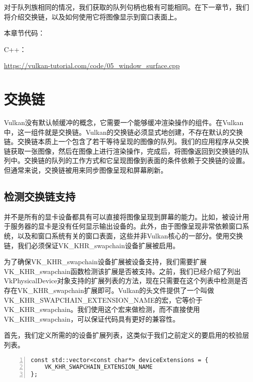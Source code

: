 \documentclass{ctexart}
\begin{document}
对于队列族相同的情况，我们获取的队列句柄也极有可能相同。在下一章节，我们将介绍交换链，以及如何使用它将图像显示到窗口表面上。

本章节代码：

C++：

\url{https://vulkan-tutorial.com/code/05_window_surface.cpp}

\newpage
\section{交换链}

Vulkan没有默认帧缓冲的概念，它需要一个能够缓冲渲染操作的组件。在Vulkan中，这一组件就是交换链。Vulkan的交换链必须显式地创建，不存在默认的交换链。交换链本质上一个包含了若干等待呈现的图像的队列。我们的应用程序从交换链获取一张图像，然后在图像上进行渲染操作，完成后，将图像返回到交换链的队列中。交换链的队列的工作方式和它呈现图像到表面的条件依赖于交换链的设置。但通常来说，交换链被用来同步图像呈现和屏幕刷新。

\subsection{检测交换链支持}

并不是所有的显卡设备都具有可以直接将图像呈现到屏幕的能力。比如，被设计用于服务器的显卡是没有任何显示输出设备的。此外，由于图像呈现非常依赖窗口系统，以及和窗口系统有关的窗口表面，这些并非Vulkan核心的一部分。使用交换链，我们必须保证VK\_KHR\_swapchain设备扩展被启用。

为了确保VK\_KHR\_swapchain设备扩展被设备支持，我们需要扩展VK\_KHR\_swapchain函数检测该扩展是否被支持。之前，我们已经介绍了列出VkPhysicalDevice对象支持的扩展列表的方法，现在只需要在这个列表中检测是否存在VK\_KHR\_swapchain扩展即可。Vulkan的头文件提供了一个叫做VK\_KHR\_SWAPCHAIN\_EXTENSION\_NAME的宏，它等价于VK\_KHR\_swapchain。我们使用这个宏来做检测，而不直接使用VK\_KHR\_swapchain，可以保证代码具有更好的兼容性。

首先，我们定义所需的的设备扩展列表，这类似于我们之前定义的要启用的校验层列表。

\begin{lstlisting}[language={[ANSI]C},keywordstyle=\color{blue!70},commentstyle=\color{red!50!green!50!blue!50},frame=shadowbox, rulesepcolor=\color{red!20!green!20!blue!20},basicstyle=\small,numbers=left, numberstyle=\tiny,breaklines=true]
const std::vector<const char*> deviceExtensions = {
	VK_KHR_SWAPCHAIN_EXTENSION_NAME
};
\end{lstlisting}
\end{document}
